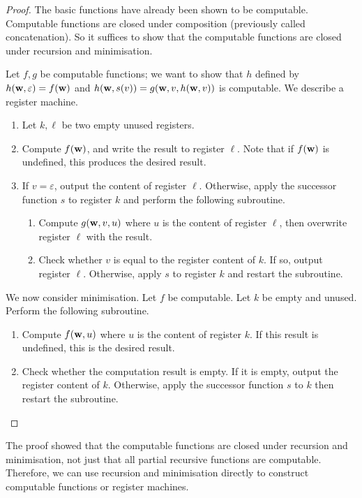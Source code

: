 \begin{proof}
	The basic functions have already been shown to be computable.
	Computable functions are closed under composition (previously called concatenation).
	So it suffices to show that the computable functions are closed under recursion and minimisation.

	Let \( f, g \) be computable functions; we want to show that \( h \) defined by \( h(\vb w, \varepsilon) = f(\vb w) \) and \( h(\vb w, s(v)) = g(\vb w, v, h(\vb w, v)) \) is computable.
	We describe a register machine.
	\begin{enumerate}
		\item Let \( k, \ell \) be two empty unused registers.
		\item Compute \( f(\vb w) \), and write the result to register \( \ell \).
			Note that if \( f(\vb w) \) is undefined, this produces the desired result.
		\item If \( v = \varepsilon \), output the content of register \( \ell \).
			Otherwise, apply the successor function \( s \) to register \( k \) and perform the following subroutine.
			\begin{enumerate}
				\item Compute \( g(\vb w, v, u) \) where \( u \) is the content of register \( \ell \), then overwrite register \( \ell \) with the result.
				\item Check whether \( v \) is equal to the register content of \( k \).
					If so, output register \( \ell \).
					Otherwise, apply \( s \) to register \( k \) and restart the subroutine.
			\end{enumerate}
	\end{enumerate}
	We now consider minimisation.
	Let \( f \) be computable.
	Let \( k \) be empty and unused.
	Perform the following subroutine.
	\begin{enumerate}
		\item Compute \( f(\vb w, u) \) where \( u \) is the content of register \( k \).
			If this result is undefined, this is the desired result.
		\item Check whether the computation result is empty.
			If it is empty, output the register content of \( k \).
			Otherwise, apply the successor function \( s \) to \( k \) then restart the subroutine.
	\end{enumerate}
\end{proof}
\begin{remark}
	The proof showed that the computable functions are closed under recursion and minimisation, not just that all partial recursive functions are computable.
	Therefore, we can use recursion and minimisation directly to construct computable functions or register machines.
\end{remark}

